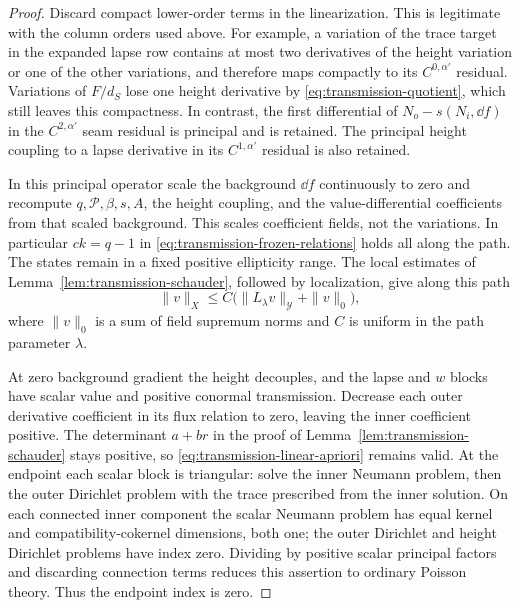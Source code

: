\begin{proof}
Discard compact lower-order terms in the linearization.  This is
legitimate with the column orders used above.  For example, a
variation of the trace target in the expanded lapse row contains
at most two derivatives of the height variation or one of the
other variations, and therefore maps compactly to its
$C^{0,\alpha'}$ residual.  Variations of $F/d_S$ lose one height
derivative by \eqref{eq:transmission-quotient}, which still leaves
this compactness.  In contrast, the first differential of
$N_o-s(N_i,\dd f)$ in the $C^{2,\alpha'}$ seam residual is
principal and is retained.  The principal height coupling to a
lapse derivative in its $C^{1,\alpha'}$ residual is also retained.

In this principal operator scale the background $\dd f$ continuously
to zero and recompute $q,\mathcal P,\beta,s,A$, the height coupling,
and the value-differential coefficients from that scaled background.
This scales coefficient fields, not the variations.  In particular
$ck=q-1$ in \eqref{eq:transmission-frozen-relations} holds all
along the path.  The states remain in a fixed positive ellipticity
range.  The local estimates of
Lemma~\ref{lem:transmission-schauder}, followed by localization,
give along this path
\begin{equation}
 \|v\|_X\leq C\bigl(\|L_\lambda v\|_{\mathscr Y}
                                  +\|v\|_0\bigr),
 \label{eq:transmission-linear-apriori}
\end{equation}
where $\|v\|_0$ is a sum of field supremum norms and $C$ is
uniform in the path parameter $\lambda$.

At zero background gradient the height decouples, and the lapse
and $w$ blocks have scalar value and positive conormal transmission.
Decrease each outer derivative coefficient in its flux relation to
zero, leaving the inner coefficient positive.  The determinant
$a+br$ in the proof of
Lemma~\ref{lem:transmission-schauder} stays positive, so
\eqref{eq:transmission-linear-apriori} remains valid.  At the
endpoint each scalar block is triangular: solve the inner Neumann
problem, then the outer Dirichlet problem with the trace prescribed
from the inner solution.  On each connected inner component the
scalar Neumann problem has equal kernel and compatibility-cokernel
dimensions, both one; the outer Dirichlet and height Dirichlet
problems have index zero.  Dividing by positive scalar principal
factors and discarding connection terms reduces this assertion to
ordinary Poisson theory.  Thus the endpoint index is zero.


\end{proof}

